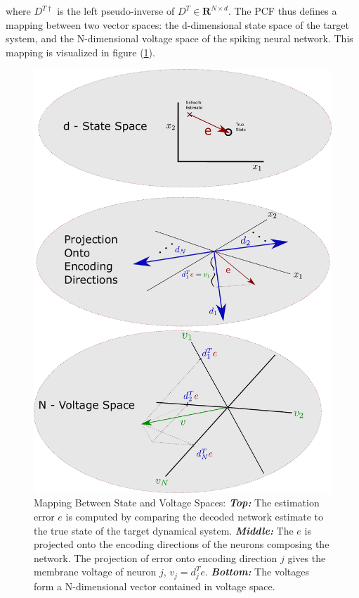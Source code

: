 \begin{enumerate}
where $D^{T \dagger}$ is the left pseudo-inverse of $D^T \in \mathbf{R}^{N \times d}$. The PCF thus defines a mapping between two vector spaces: the d-dimensional state space of the target system, and the N-dimensional voltage space of the spiking neural network. This mapping is visualized in figure (\ref{fig:derivation:basic_model:pcf_e_v_map}). 
\begin{figure}
    \centering
    \includegraphics[scale=.703]{figures/pcf_e_v_graphic.pdf}
    \caption{Mapping Between State and Voltage Spaces: \textbf{\textit{Top:}} The estimation error $e$ is computed by comparing the decoded network estimate to the true state of the target dynamical system.  \textbf{\textit{Middle:}} The $e$ is projected onto the encoding directions of the neurons composing the network. The projection of error onto encoding direction $j$ gives the membrane voltage of neuron $j$, $v_j = d_j^T e$. \textbf{\textit{Bottom:}} The voltages form a N-dimensional vector contained in voltage space.}
    \label{fig:derivation:basic_model:pcf_e_v_map}
\end{figure}


\end{enumerate}
